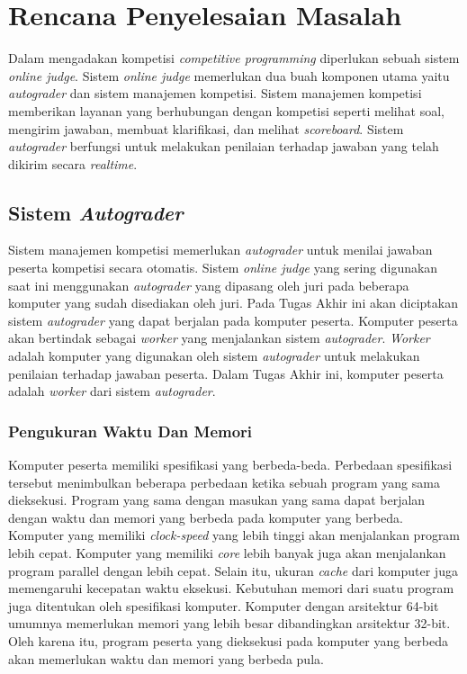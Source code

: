 \chapter{Rencana Penyelesaian Masalah}

\par Dalam mengadakan kompetisi \textit{competitive programming} diperlukan sebuah sistem \textit{online judge}. Sistem \textit{online judge} memerlukan dua buah komponen utama yaitu \textit{autograder} dan sistem manajemen kompetisi. Sistem manajemen kompetisi memberikan layanan yang berhubungan dengan kompetisi seperti melihat soal, mengirim jawaban, membuat klarifikasi, dan melihat \textit{scoreboard}. Sistem \textit{autograder} berfungsi untuk melakukan penilaian terhadap jawaban yang telah dikirim secara \textit{realtime}.

\section{Sistem \textit{Autograder}}

\par Sistem manajemen kompetisi memerlukan \textit{autograder} untuk menilai jawaban peserta kompetisi secara otomatis. Sistem \textit{online judge} yang sering digunakan saat ini menggunakan \textit{autograder} yang dipasang oleh juri pada beberapa komputer yang sudah disediakan oleh juri. Pada Tugas Akhir ini akan diciptakan sistem \textit{autograder} yang dapat berjalan pada komputer peserta. Komputer peserta akan bertindak sebagai \textit{worker} yang menjalankan sistem \textit{autograder}. \textit{Worker} adalah komputer yang digunakan oleh sistem \textit{autograder} untuk melakukan penilaian terhadap jawaban peserta. Dalam Tugas Akhir ini, komputer peserta adalah \textit{worker} dari sistem \textit{autograder}.

\subsection{Pengukuran Waktu Dan Memori} \label{subsec:time-memory-measure}

\par Komputer peserta memiliki spesifikasi yang berbeda-beda. Perbedaan spesifikasi tersebut menimbulkan beberapa perbedaan ketika sebuah program yang sama dieksekusi. Program yang sama dengan masukan yang sama dapat berjalan dengan waktu dan memori yang berbeda pada komputer yang berbeda. Komputer yang memiliki \textit{clock-speed} yang lebih tinggi akan menjalankan program lebih cepat. Komputer yang memiliki \textit{core} lebih banyak juga akan menjalankan program parallel dengan lebih cepat. Selain itu, ukuran \textit{cache} dari komputer juga memengaruhi kecepatan waktu eksekusi. Kebutuhan memori dari suatu program juga ditentukan oleh spesifikasi komputer. Komputer dengan arsitektur 64-bit umumnya memerlukan memori yang lebih besar dibandingkan arsitektur 32-bit. Oleh karena itu, program peserta yang dieksekusi pada komputer yang berbeda akan memerlukan waktu dan memori yang berbeda pula.

